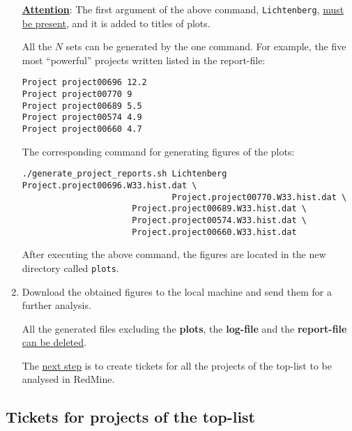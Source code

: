 \documentclass[12pt,a4paper,onecolumn]{article}
\begin{document}
\begin{enumerate}
\underline{\textbf{Attention}}: The first argument of the above command, \lstinline{Lichtenberg}, \underline{must be present}, and it is added to titles of plots.
\vspace{\baselineskip}

All the $N$ sets can be generated by the one command.
For example, the five most ``powerful'' projects written listed in the report-file:
\begin{lstlisting}
Project project00696 12.2
Project project00770 9
Project project00689 5.5
Project project00574 4.9
Project project00660 4.7
\end{lstlisting}
The corresponding command for generating figures of the plots:
\begin{lstlisting}
./generate_project_reports.sh Lichtenberg Project.project00696.W33.hist.dat \
			                  Project.project00770.W33.hist.dat \
					  Project.project00689.W33.hist.dat \
					  Project.project00574.W33.hist.dat \
					  Project.project00660.W33.hist.dat
\end{lstlisting}

After executing the above command, the figures are located in the new directory called \lstinline{plots}.

\item Download the obtained figures to the local machine and send them for a further analysis.

All the generated files excluding the \textbf{plots}, the \textbf{log-file} and the \textbf{report-file} \underline{can be deleted}.

The \underline{next step} is to create tickets for all the projects of the top-list to be analysed in RedMine.

\end{enumerate}


\subsection{Tickets for projects of the top-list}
\label{sec:tickets_powerusers}

\end{document}
